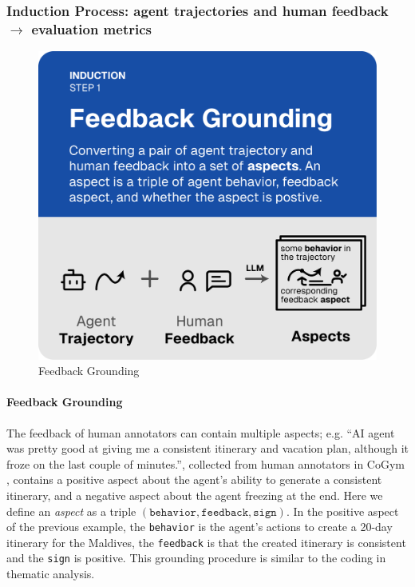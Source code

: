 \subsubsection{Induction Process: agent trajectories and human feedback $\rightarrow$ evaluation metrics}
\label{sec:induction_process}

\begin{figure}
  \vspace{-15pt}
  \includegraphics[width=\linewidth]{figs/autolibra_step_1.pdf}
  \vspace{-10pt}
  \caption{Feedback Grounding}
  \label{fig:feedback_grounding}
\end{figure}
\paragraph{Feedback Grounding}
The feedback of human annotators can contain multiple aspects; e.g. \textsf{``AI agent was pretty good
at giving me a consistent itinerary and vacation plan, although it froze on the last couple of minutes.''},
collected from human annotators in CoGym \citep{shao2024collaborative}, contains a positive aspect
about the agent's ability to generate a consistent itinerary, and a negative aspect about the agent freezing
at the end. Here we define an \emph{aspect} as a triple $(\texttt{behavior}, \texttt{feedback}, \texttt{sign})$.
In the positive aspect of the previous example, the \texttt{behavior} is the agent's actions to create
a 20-day itinerary for the Maldives, the \texttt{feedback} is that the created itinerary is consistent and the \texttt{sign} is positive. This grounding procedure is similar to the coding in thematic analysis.


